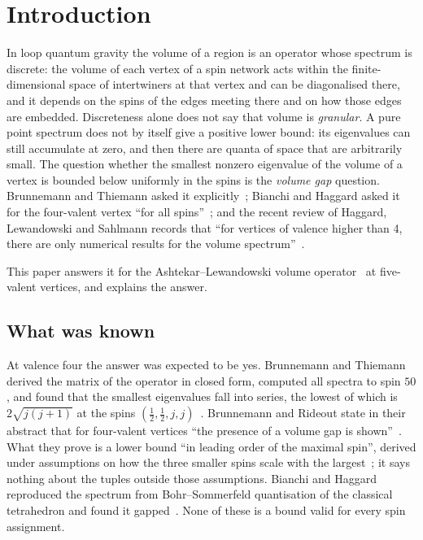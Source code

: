 \section{Introduction}\label{sec:intro}

In loop quantum gravity the volume of a region is an operator whose spectrum is
discrete: the volume of each vertex of a spin network acts within the
finite-dimensional space of intertwiners at that vertex and can be diagonalised there,
and it depends on the spins of the edges meeting there and on how those edges are
embedded. Discreteness alone does not say that volume is \emph{granular}. A pure point
spectrum does not by itself give a positive lower bound: its eigenvalues can still
accumulate at zero, and then there are quanta of space that are arbitrarily small. The question whether
the smallest nonzero eigenvalue of the volume of a vertex is bounded below
uniformly in the spins is the \emph{volume gap} question. Brunnemann and Thiemann
asked it explicitly~\cite{BT2006}; Bianchi and Haggard asked it for the
four-valent vertex ``for all spins''~\cite{BH2011}; and the recent review of
Haggard, Lewandowski and Sahlmann records that ``for vertices of valence higher
than 4, there are only numerical results for the volume spectrum''~\cite{HLS2023}.

This paper answers it for the Ashtekar--Lewandowski volume operator~\cite{AL1998} at
five-valent vertices, and explains the answer.

\subsection{What was known}

At valence four the answer was expected to be yes. Brunnemann and Thiemann derived
the matrix of the operator in closed form, computed all spectra to spin $50$, and
found that the smallest eigenvalues fall into series, the lowest of which is
$2\sqrt{j(j+1)}$ at the spins $(\frac12,\frac12,j,j)$~\cite[table on p.~38]{BT2006}.
Brunnemann and Rideout state in their abstract that for four-valent vertices ``the
presence of a volume gap is shown''~\cite{BR2008a}. What they prove is a lower bound
``in leading order of the maximal spin'', derived under assumptions on how the three
smaller spins scale with the largest~\cite[\S5.4]{BR2008a}; it says nothing about the
tuples outside those assumptions. Bianchi and Haggard reproduced the spectrum from
Bohr--Sommerfeld quantisation of the classical tetrahedron and found it
gapped~\cite{BH2011,BH2012}. None of these is a bound valid for every spin
assignment.

